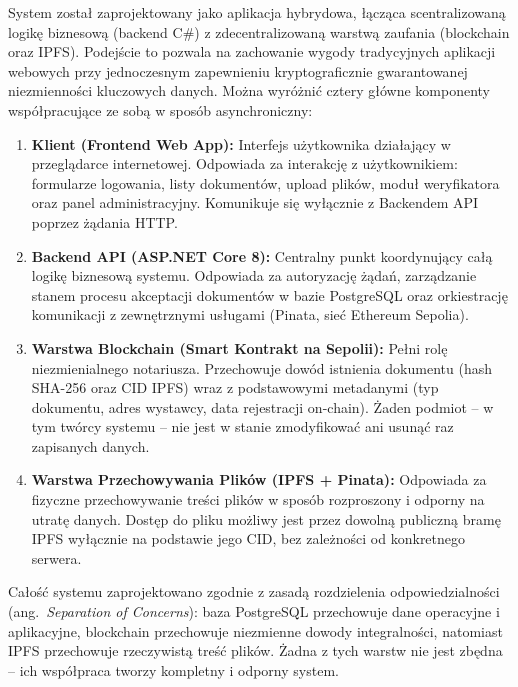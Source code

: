 \documentclass[12pt,a4paper,twoside]{report}
\begin{document}
System został zaprojektowany jako aplikacja hybrydowa, łącząca scentralizowaną logikę
biznesową (backend C\#) z zdecentralizowaną warstwą zaufania (blockchain oraz IPFS).
Podejście to pozwala na zachowanie wygody tradycyjnych aplikacji webowych przy jednoczesnym
zapewnieniu kryptograficznie gwarantowanej niezmienności kluczowych danych. Można wyróżnić
cztery główne komponenty współpracujące ze sobą w sposób asynchroniczny:

\begin{enumerate}
    \item \textbf{Klient (Frontend Web App):} Interfejs użytkownika działający w przeglądarce
          internetowej. Odpowiada za interakcję z użytkownikiem: formularze logowania, listy
          dokumentów, upload plików, moduł weryfikatora oraz panel administracyjny.
          Komunikuje się wyłącznie z Backendem API poprzez żądania HTTP.

    \item \textbf{Backend API (ASP.NET Core 8):} Centralny punkt koordynujący całą logikę
          biznesową systemu. Odpowiada za autoryzację żądań, zarządzanie stanem procesu
          akceptacji dokumentów w bazie PostgreSQL oraz orkiestrację komunikacji
          z zewnętrznymi usługami (Pinata, sieć Ethereum Sepolia).

    \item \textbf{Warstwa Blockchain (Smart Kontrakt na Sepolii):} Pełni rolę
          niezmienialnego notariusza. Przechowuje dowód istnienia dokumentu (hash SHA-256
          oraz CID IPFS) wraz z podstawowymi metadanymi (typ dokumentu, adres wystawcy,
          data rejestracji on-chain). Żaden podmiot -- w tym twórcy systemu -- nie jest
          w stanie zmodyfikować ani usunąć raz zapisanych danych.

    \item \textbf{Warstwa Przechowywania Plików (IPFS + Pinata):} Odpowiada za fizyczne
          przechowywanie treści plików w sposób rozproszony i odporny na utratę danych.
          Dostęp do pliku możliwy jest przez dowolną publiczną bramę IPFS wyłącznie
          na podstawie jego CID, bez zależności od konkretnego serwera.
\end{enumerate}

Całość systemu zaprojektowano zgodnie z zasadą rozdzielenia odpowiedzialności
(ang.~\textit{Separation of Concerns}): baza PostgreSQL przechowuje dane operacyjne
i aplikacyjne, blockchain przechowuje niezmienne dowody integralności, natomiast IPFS
przechowuje rzeczywistą treść plików. Żadna z tych warstw nie jest zbędna -- ich
współpraca tworzy kompletny i odporny system.
\end{document}
